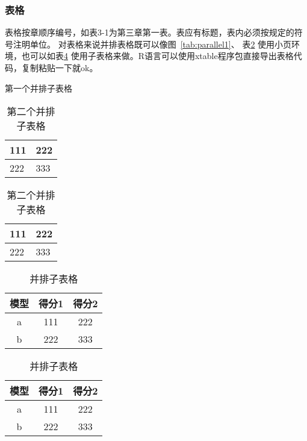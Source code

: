 \documentclass{SUFEThesis}
\begin{document}
\subsubsection{表格}
表格按章顺序编号，如表3-1为第三章第一表。表应有标题，表内必须按规定的符号注明单位。
对表格来说并排表格既可以像图~\ref{tab:parallel1}、
表\ref{tab:parallel2} 使用小页环境，也可以如表\ref{tab:subtable} 使用子表格来做。R语言可以使用xtable程序包直接导出表格代码，复制粘贴一下就ok。

\begin{table}[htbp]
  \noindent\begin{minipage}{0.5\textwidth}
    \centering
    \caption{第一个并排子表格}
    \label{tab:parallel1}
    \begin{tabular}{p{2cm}p{2cm}}
      \toprule
      111 & 222 \\\midrule
      222 & 333 \\\bottomrule
    \end{tabular}
  \end{minipage}%
  \begin{minipage}{0.5\textwidth}
    \centering
    \caption{第二个并排子表格}
    \label{tab:parallel2}
    \begin{tabular}{p{2cm}p{2cm}}
      \toprule
      111 & 222 \\\midrule
      222 & 333 \\\bottomrule
    \end{tabular}
  \end{minipage}
\end{table}


\begin{table}[htbp]
  \centering
  \caption{并排子表格}
  \label{tab:subtable}
  {
    \begin{tabular}{c|c|c}
      \hline
      模型 & 得分1 & 得分2 \\
      \hline
      a  & 111 & 222 \\
      b  & 222 & 333 \\
      \hline
    \end{tabular}
  }
  \hskip2cm
  {
    \begin{tabular}{c|c|c}
      \hline
      模型 & 得分1 & 得分2 \\
      \hline
      a  & 111 & 222 \\
      b  & 222 & 333 \\
      \hline
    \end{tabular}
  }
\end{table}
\end{document}

